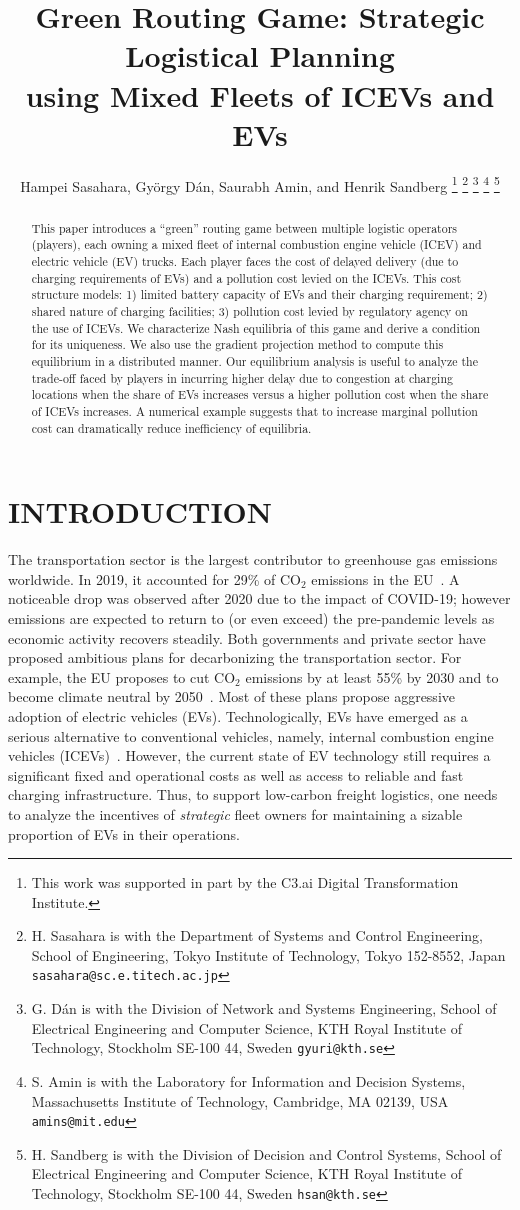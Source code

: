 \documentclass[letterpaper, 10 pt, conference]{ieeeconf}  %
\title{\LARGE \bf
Green Routing Game: Strategic Logistical Planning\\ using Mixed Fleets of ICEVs and EVs
}
\author{Hampei Sasahara, Gy\"{o}rgy D\'{a}n, Saurabh Amin, and Henrik Sandberg%
\thanks{This work was supported in part by the C3.ai Digital Transformation Institute.}%
\thanks{H. Sasahara is with the Department of Systems and Control Engineering, School of Engineering, Tokyo Institute of Technology, Tokyo 152-8552, Japan
        {\tt\small sasahara@sc.e.titech.ac.jp}}%
\thanks{G. D\'{a}n is with the Division of Network and Systems Engineering, School of Electrical Engineering and Computer Science, KTH Royal Institute of Technology, Stockholm SE-100 44, Sweden
		{\tt\small gyuri@kth.se}}%
\thanks{S. Amin is with the Laboratory for Information and Decision Systems,  Massachusetts Institute of Technology, Cambridge, MA 02139, USA
		{\tt\small amins@mit.edu}}%
\thanks{H. Sandberg is with the Division of Decision and Control Systems, School of Electrical Engineering and Computer Science, KTH Royal Institute of Technology, Stockholm SE-100 44, Sweden
        {\tt\small hsan@kth.se}}%
}
\begin{document}
\maketitle
\thispagestyle{empty}
\pagestyle{empty}


\begin{abstract}

This paper introduces a ``green'' routing game between multiple logistic operators (players), each owning a mixed fleet of internal combustion engine vehicle (ICEV) and electric vehicle (EV) trucks.
Each player faces the cost of delayed delivery  (due to charging requirements of EVs) and a pollution cost levied on the ICEVs.
This cost structure models:
1) limited battery capacity of EVs and their charging requirement;
2) shared nature of charging facilities;
3) pollution cost levied by regulatory agency on the use of ICEVs.
We characterize Nash equilibria of this game and derive a condition for its uniqueness.
We also use the gradient projection method to compute this equilibrium in a distributed manner. 
Our equilibrium analysis is useful to analyze the trade-off faced by players in incurring higher delay due to congestion
at charging locations when the share of EVs increases versus a higher pollution cost when the share of ICEVs increases.
A numerical example suggests that to increase marginal pollution cost can dramatically reduce inefficiency of equilibria.
\end{abstract}


\section{INTRODUCTION}

The transportation sector is the largest contributor to greenhouse gas emissions worldwide.
In 2019, it accounted for 29\% of $\mathrm{CO_2}$ emissions in the EU~\cite{European2021National}.
A noticeable drop was observed after 2020 due to the impact of COVID-19; however emissions are expected to return to (or even exceed) the pre-pandemic levels as economic activity recovers steadily.
Both governments and private sector have proposed ambitious plans for decarbonizing the transportation sector.
For example, the EU proposes to cut $\mathrm{CO_2}$ emissions by at least 55\% by 2030 and to become climate neutral by 2050~\cite{European2020Stepping}.
Most of these plans propose aggressive adoption of electric vehicles (EVs).
Technologically, EVs have emerged as a serious alternative to conventional vehicles, namely, internal combustion engine vehicles (ICEVs)~\cite{Yong2015Review}.
However, the current state of EV technology still requires a significant fixed and operational costs as well as access to reliable and fast charging infrastructure.
Thus, to support low-carbon freight logistics, one needs to analyze the incentives of \emph{strategic} fleet owners for maintaining a sizable proportion of EVs in their operations.
\end{document}
